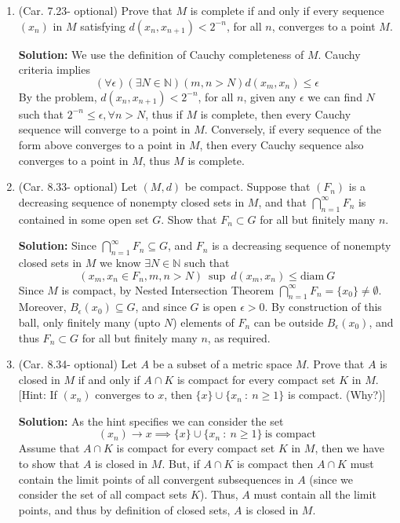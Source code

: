 \documentclass{article}
\def\ge{\geqslant}
\def\le{\leqslant}
\def\to{\rightarrow}
\def\NN{\mathbb N}
\begin{document}
\begin{enumerate}

\item (Car. 7.23- optional) Prove that $M$ is complete if and only if every sequence $(x_n)$ in $M$ satisfying $d(x_n, x_{n+1}) < 2^{-n}$, for all $n$, converges to a point $M$.

\textbf{Solution:} We use the definition of Cauchy completeness of $M$.
Cauchy criteria implies
\[
(\forall \epsilon)(\exists N\in\NN)(m,n > N)d(x_m,x_n)\le\epsilon
\]
By the problem, $d(x_n, x_{n+1}) < 2^{-n}$, for all $n$, given any
$\epsilon$ we can find $N$ such that $2^{-n} \le \epsilon, \forall n > N$, thus
if $M$ is complete, then every Cauchy sequence will converge to a point in $M$.
Conversely, if every sequence of the form above converges to a point in $M$, 
then every Cauchy sequence also converges to a point in $M$, thus $M$ is
complete.

\item (Car. 8.33- optional) Let $(M,d)$ be compact. Suppose that $(F_n)$ is a decreasing sequence of nonempty closed sets in $M$, and that $\bigcap_{n=1}^{\infty} F_n$ is contained in some open set $G$. Show that $F_n \subset G$ for all but finitely many $n$.

\textbf{Solution:} Since $\bigcap_{n=1}^{\infty} F_n \subseteq G$, and $F_n$ 
is a decreasing sequence of nonempty closed sets in $M$ we
know $\exists N \in \NN$ such that 
\[
(x_m,x_n\in F_n, m,n>N)\ \sup\ d(x_m,x_n)  \le \textrm{diam}\ G
\]
Since $M$ is compact, by Nested Intersection Theorem $\bigcap_{n=1}^{\infty} F_n
= \{x_0\} \ne \emptyset$. Moreover, $B_\epsilon(x_0) \subseteq G$, and since
$G$ is open $\epsilon >0$. By construction of this ball, only finitely
many (upto $N$) elements of $F_n$ can be outside $B_\epsilon(x_0)$, and thus
$F_n \subset G$ for all but finitely many $n$, as required.


\item (Car. 8.34- optional) Let $A$ be a subset of a metric space $M$. Prove that $A$ is closed in $M$ if and only if $A \cap K$ is compact for every compact set $K$ in $M$. [Hint: If $(x_n)$ converges to $x$, then $\{x \} \cup \{ x_n\ :\ n \ge 1 \}$ is compact. (Why?)]

\textbf{Solution:} As the hint specifies we can consider the set
\[
(x_n) \to x \implies \{x \} \cup \{ x_n\ :\ n \ge 1 \} \ \textrm{is compact}
\]
Assume that $A \cap K$ is compact for every compact set $K$ in $M$, then we
have to show that $A$ is closed in $M$. But, if $A \cap K$ is compact
then $A \cap K$ must contain the limit points of all convergent subsequences
in $A$ (since we consider the set of all compact sets $K$). 
Thus, $A$ must contain all the limit points, and thus by definition of
closed sets, $A$ is closed in $M$.


\end{enumerate}
\end{document}
